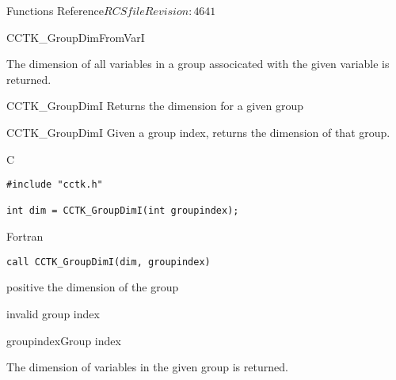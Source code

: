 \begin{cactuspart}{ Functions Reference}{$RCSfile$}{$Revision: 4641 $}
\begin{FunctionDescription}{CCTK\_GroupDimFromVarI}
\begin{Discussion}
The dimension of all variables in a group associcated with the given variable is returned.
\end{Discussion}

\begin{SeeAlsoSection}
\begin{SeeAlso}{CCTK\_GroupDimI}
Returns the dimension for a given group
\end{SeeAlso}
\end{SeeAlsoSection}
\end{FunctionDescription}

\begin{FunctionDescription}{CCTK\_GroupDimI}
\label{CCTK-GroupDimI}
Given a group index, returns the dimension of that group.

\begin{SynopsisSection}
\begin{Synopsis}{C}
\begin{verbatim}
#include "cctk.h"

int dim = CCTK_GroupDimI(int groupindex);
\end{verbatim}
\end{Synopsis}
\begin{Synopsis}{Fortran}
\begin{verbatim}
call CCTK_GroupDimI(dim, groupindex)
\end{verbatim}
\end{Synopsis}
\end{SynopsisSection}

\begin{ResultSection}
\begin{Result}{positive} the dimension of the group\end{Result}
\begin{Result}{-1} invalid group index \end{Result}
\end{ResultSection}

\begin{ParameterSection}
\begin{Parameter}{groupindex}Group index\end{Parameter}
\end{ParameterSection}

\begin{Discussion}
The dimension of variables in the given group is returned.
\end{Discussion}


\end{FunctionDescription}
\end{cactuspart}
